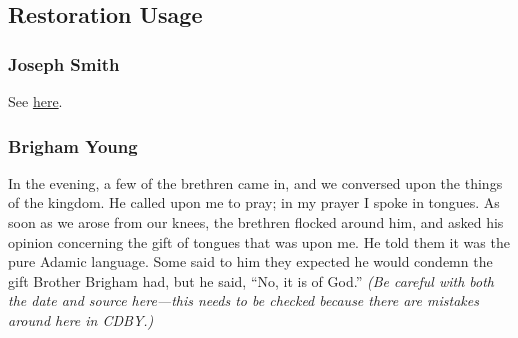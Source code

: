 \subsection{Restoration Usage} %
	\label{ADAMICLANGUAGE-RESTORATION}

	\subsubsection{Joseph Smith} %
		\label{ADAMICLANGUAGE-JS}
	
		\begin{compactdesc}
			\item[Between 4 and 20 March 1832] See \hyperref[EMS-1832-JS-CIR-4-MAR-1832-LANG]{here}.
		\end{compactdesc}
	
	\subsubsection{Brigham Young} %
		\label{ADAMICLANGUAGE-BY}
	
		\begin{compactdesc}
			\item[8 November 1832, CDBY 3] In the evening, a few of the brethren came in, and we conversed upon the things of the kingdom. He called upon me to pray; in my prayer I spoke in tongues. As soon as we arose from our knees, the brethren flocked around him, and asked his opinion concerning the gift of tongues that was upon me. He told them it was the pure Adamic language. Some said to him they expected he would condemn the gift Brother Brigham had, but he said, ``No, it is of God.'' \textit{(Be careful with both the date and source here---this needs to be checked because there are mistakes around here in CDBY.)}
		\end{compactdesc}
	

	
